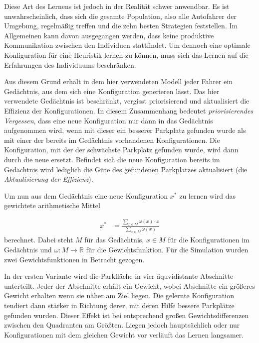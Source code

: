 Diese Art des Lernens ist jedoch in der Realität schwer anwendbar. Es ist unwahrscheinlich, dass sich die gesamte Population, also alle Autofahrer der Umgebung, regelmäßig treffen und die zehn besten Strategien feststellen. Im Allgemeinen kann davon ausgegangen werden, dass keine produktive Kommunikation zwischen den Individuen stattfindet. Um dennoch eine optimale Konfiguration für eine Heuristik lernen zu können, muss sich das Lernen auf die Erfahrungen des Individuums beschränken. 

Aus diesem Grund erhält in dem hier verwendeten Modell jeder Fahrer ein Gedächtnis, aus dem sich eine Konfiguration generieren lässt. Das hier verwendete Gedächtnis ist beschränkt, vergisst priorisierend und aktualisiert die Effizienz der Konfigurationen. In diesem Zusammenhang bedeutet \emph{priorisierendes Vergessen}, dass eine neue Konfiguration nur dann in das Gedächtnis aufgenommen wird, wenn mit dieser ein besserer Parkplatz gefunden wurde als mit einer der bereits im Gedächtnis vorhandenen Konfigurationen. Die Konfiguration, mit der der schwächste Parkplatz gefunden wurde, wird dann durch die neue ersetzt. Befindet sich die neue Konfiguration bereits im Gedächtnis wird lediglich die Güte des gefundenen Parkplatzes aktualisiert (die \emph{Aktualisierung der Effizienz}).

Um nun aus dem Gedächtnis eine neue Konfiguration $x^*$ zu lernen wird das gewichtete arithmetische Mittel 

\begin{align}
	x^{*} &= \frac{\sum\limits_{x \in M} \omega (x) \cdot x}{\sum\limits_{x \in M} \omega (x)}\label{form_gelernterParameter}
\end{align}
 berechnet. Dabei steht $M$ für das Gedächtnis, $x\in M$ für die Konfigurationen im Gedächtnis und $\omega : M \rightarrow \mathbb{R}$ für die Gewichtsfunktion. Für die Simulation wurden zwei Gewichtsfunktionen in Betracht gezogen.

In der ersten Variante wird die Parkfläche in vier äquvidistante Abschnitte unterteilt. Jeder der Abschnitte erhält ein Gewicht, wobei Abschnitte ein größeres Gewicht erhalten wenn sie näher am Ziel liegen. Die gelernte Konfiguration tendiert dann stärker in Richtung derer, mit deren Hilfe bessere Parkplätze gefunden wurden. Dieser Effekt ist bei entsprechend großen Gewichtsdifferenzen zwischen den Quadranten am Größten. Liegen jedoch hauptsächlich oder nur Konfigurationen mit dem gleichen Gewicht vor verläuft das Lernen langsamer. 

